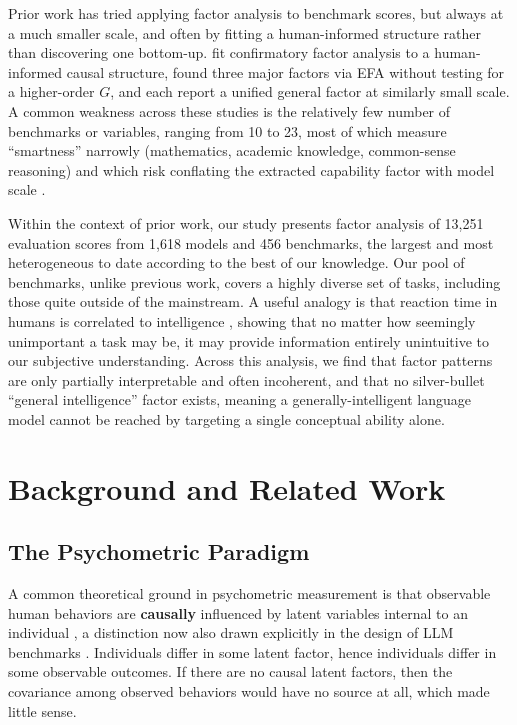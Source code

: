 \documentclass{article} %
\begin{document}
Prior work has tried applying factor analysis to benchmark scores, but always at a much smaller scale, and often by fitting a human-informed structure rather than discovering one bottom-up.
\citet{ilicagignac2024} fit confirmatory factor analysis to a human-informed causal structure, \citet{burnell2023} found three major factors via EFA without testing for a higher-order \(G\), and
\citet{krakauer2026,federiakin2025,haznitrama2026} each report a unified general factor at similarly small scale. A common weakness across these studies is the relatively few number of benchmarks or
variables, ranging from 10 to 23, most of which measure ``smartness'' narrowly (mathematics, academic knowledge, common-sense reasoning) and which risk conflating the extracted capability factor with
model scale \citep{kearns2026}.

Within the context of prior work, our study presents factor analysis of 13,251 evaluation scores from 1,618 models and 456 benchmarks, the largest and most heterogeneous to date according to the best
of our knowledge. Our pool of benchmarks, unlike previous work, covers a highly diverse set of tasks, including those quite outside of the mainstream. A useful analogy is that reaction time in humans
is correlated to intelligence \citep{kranzler1989}, showing that no matter how seemingly unimportant a task may be, it may provide information entirely unintuitive to our subjective understanding.
Across this analysis, we find that factor patterns are only partially interpretable and often incoherent, and that no silver-bullet ``general intelligence'' factor exists, meaning a
generally-intelligent language model cannot be reached by targeting a single conceptual ability alone.

\hypertarget{background-and-related-work}{%
\section{Background and Related Work}\label{background-and-related-work}}

\hypertarget{the-psychometric-paradigm}{%
\subsection{The Psychometric Paradigm}\label{the-psychometric-paradigm}}

A common theoretical ground in psychometric measurement is that observable human behaviors are \textbf{causally} influenced by latent variables internal to an individual \citep{borsboom2004}, a
distinction now also drawn explicitly in the design of LLM benchmarks \citep{federiakin2025}. Individuals differ in some latent factor, hence individuals differ in some observable outcomes. If there
are no causal latent factors, then the covariance among observed behaviors would have no source at all, which made little sense.
\end{document}
